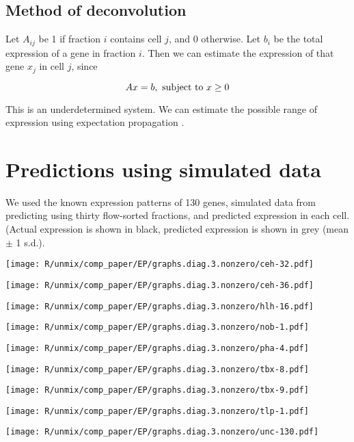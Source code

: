 \documentclass[landscape,a0]{a0poster}
\begin{document}
\begin{multicols}{4}
\subsection*{Method of deconvolution}

Let $A_{ij}$ be 1 if fraction $i$ contains cell $j$, and 0 otherwise.
Let $b_i$ be the total expression of a gene in fraction $i$.
Then we can estimate the expression of that gene $x_j$ in cell $j$,
since

$$
A x = b, \mbox{ subject to }
x \ge 0 \\
$$

This is an underdetermined system. We can estimate the possible range
of expression using expectation propagation \cite{minka_expectation_2001}.

\section*{Predictions using simulated data}

We used the known expression patterns of 130 genes, simulated data from predicting using
thirty flow-sorted fractions, and predicted expression in each cell.
(Actual expression is shown in black, predicted expression is shown in grey (mean $\pm$ 1 s.d.).

\texttt{[image: R/unmix/comp\_paper/EP/graphs.diag.3.nonzero/ceh-32.pdf]}

\texttt{[image: R/unmix/comp\_paper/EP/graphs.diag.3.nonzero/ceh-36.pdf]}

\texttt{[image: R/unmix/comp\_paper/EP/graphs.diag.3.nonzero/hlh-16.pdf]}


\texttt{[image: R/unmix/comp\_paper/EP/graphs.diag.3.nonzero/nob-1.pdf]}

\texttt{[image: R/unmix/comp\_paper/EP/graphs.diag.3.nonzero/pha-4.pdf]}

\texttt{[image: R/unmix/comp\_paper/EP/graphs.diag.3.nonzero/tbx-8.pdf]}

\texttt{[image: R/unmix/comp\_paper/EP/graphs.diag.3.nonzero/tbx-9.pdf]}

\texttt{[image: R/unmix/comp\_paper/EP/graphs.diag.3.nonzero/tlp-1.pdf]}

\texttt{[image: R/unmix/comp\_paper/EP/graphs.diag.3.nonzero/unc-130.pdf]}


\end{multicols}
\end{document}
